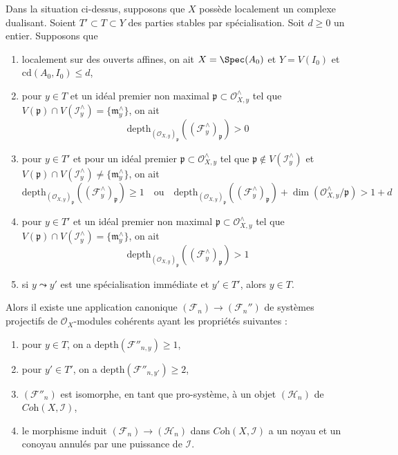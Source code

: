 \begin{lemma}
\label{lemma-improvement-formal-coherent-module-better}
Dans la situation ci-dessus, supposons que $X$ possède localement un complexe dualisant.
Soient $T' \subset T \subset Y$ des parties stables par spécialisation.
Soit $d \geq 0$ un entier. Supposons que
\begin{enumerate}
\item[(a)] localement sur des ouverts affines, on ait $X = \Spec(A_0)$ et $Y = V(I_0)$
et $\text{cd}(A_0, I_0) \leq d$,
\item[(b)] pour $y \in T$ et un idéal premier non maximal
$\mathfrak p \subset \mathcal{O}_{X, y}^\wedge$ tel que
$V(\mathfrak p) \cap V(\mathcal{I}_y^\wedge) = \{\mathfrak m_y^\wedge\}$,
on ait
$$
\text{depth}_{(\mathcal{O}_{X, y})_\mathfrak p}
((\mathcal{F}^\wedge_y)_\mathfrak p) > 0
$$
\item[(c)] pour $y \in T'$ et pour un idéal premier
$\mathfrak p \subset \mathcal{O}_{X, y}^\wedge$ tel que
$\mathfrak p \not \in V(\mathcal{I}_y^\wedge)$
et $V(\mathfrak p) \cap V(\mathcal{I}_y^\wedge) \not =
\{\mathfrak m_y^\wedge\}$, on ait
$$
\text{depth}_{(\mathcal{O}_{X, y})_\mathfrak p}
((\mathcal{F}^\wedge_y)_\mathfrak p) \geq 1
\quad\text{ou}\quad
\text{depth}_{(\mathcal{O}_{X, y})_\mathfrak p}
((\mathcal{F}^\wedge_y)_\mathfrak p) +
\dim(\mathcal{O}_{X, y}^\wedge/\mathfrak p) > 1 + d
$$
\item[(d)] pour $y \in T'$ et un idéal premier non maximal
$\mathfrak p \subset \mathcal{O}_{X, y}^\wedge$ tel que
$V(\mathfrak p) \cap V(\mathcal{I}_y^\wedge) = \{\mathfrak m_y^\wedge\}$,
on ait
$$
\text{depth}_{(\mathcal{O}_{X, y})_\mathfrak p}
((\mathcal{F}^\wedge_y)_\mathfrak p) > 1
$$
\item[(e)] si $y \leadsto y'$ est une spécialisation immédiate et
$y' \in T'$, alors $y \in T$.
\end{enumerate}
Alors il existe une application canonique $(\mathcal{F}_n) \to (\mathcal{F}_n'')$
de systèmes projectifs de $\mathcal{O}_X$-modules cohérents
ayant les propriétés suivantes :
\begin{enumerate}
\item pour $y \in T$, on a $\text{depth}(\mathcal{F}''_{n, y}) \geq 1$,
\item pour $y' \in T'$, on a $\text{depth}(\mathcal{F}''_{n, y'}) \geq 2$,
\item $(\mathcal{F}''_n)$ est isomorphe, en tant que pro-système, à un objet
$(\mathcal{H}_n)$ de $\textit{Coh}(X, \mathcal{I})$,
\item le morphisme induit $(\mathcal{F}_n) \to (\mathcal{H}_n)$ dans
$\textit{Coh}(X, \mathcal{I})$ a un noyau et un conoyau
annulés par une puissance de $\mathcal{I}$.
\end{enumerate}
\end{lemma}

